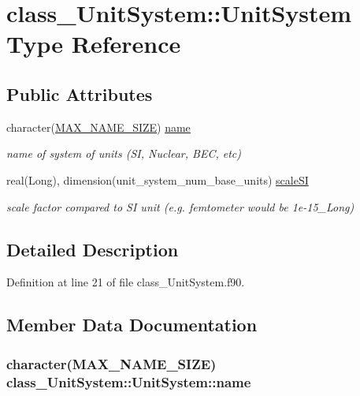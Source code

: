 \hypertarget{typeclass__UnitSystem_1_1UnitSystem}{
\section{class\_\-UnitSystem::UnitSystem Type Reference}
\label{typeclass__UnitSystem_1_1UnitSystem}
}
\subsection*{Public Attributes}
\begin{DoxyCompactItemize}
\item 
character(\hyperlink{namespaceclass__UnitSystem_a2dc5b6d848def3f7f8306f80535efdc3}{MAX\_\-NAME\_\-SIZE}) \hyperlink{typeclass__UnitSystem_1_1UnitSystem_a8ee1485a660d87ddb7445922b7ec1339}{name}
\begin{DoxyCompactList}\small\item\em name of system of units (SI, Nuclear, BEC, etc) \item\end{DoxyCompactList}\item 
real(Long), dimension(unit\_\-system\_\-num\_\-base\_\-units) \hyperlink{typeclass__UnitSystem_1_1UnitSystem_ae45fad079edfabb5d09a78c707c76326}{scaleSI}
\begin{DoxyCompactList}\small\item\em scale factor compared to SI unit (e.g. femtometer would be 1e-\/15\_\-Long) \item\end{DoxyCompactList}\end{DoxyCompactItemize}


\subsection{Detailed Description}


Definition at line 21 of file class\_\-UnitSystem.f90.



\subsection{Member Data Documentation}
\hypertarget{typeclass__UnitSystem_1_1UnitSystem_a8ee1485a660d87ddb7445922b7ec1339}{
\subsubsection[{name}]{\setlength{\rightskip}{0pt plus 5cm}character({\bf MAX\_\-NAME\_\-SIZE}) {\bf class\_\-UnitSystem::UnitSystem::name}}}
\label{typeclass__UnitSystem_1_1UnitSystem_a8ee1485a660d87ddb7445922b7ec1339}


